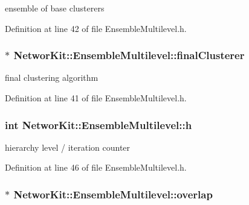 ensemble of base clusterers 



Definition at line 42 of file Ensemble\-Multilevel.\-h.

\hypertarget{class_networ_kit_1_1_ensemble_multilevel_a7a6938877c0d0f405b953eda8053c181}{
\subsubsection[{final\-Clusterer}]{$\ast$ Networ\-Kit\-::\-Ensemble\-Multilevel\-::final\-Clusterer\hspace{0.3cm}{\ttfamily [protected]}}}\label{class_networ_kit_1_1_ensemble_multilevel_a7a6938877c0d0f405b953eda8053c181}


final clustering algorithm 



Definition at line 41 of file Ensemble\-Multilevel.\-h.

\hypertarget{class_networ_kit_1_1_ensemble_multilevel_a4bc6df355537771fcdc186b308232391}{
\subsubsection[{h}]{\setlength{\rightskip}{0pt plus 5cm}int Networ\-Kit\-::\-Ensemble\-Multilevel\-::h\hspace{0.3cm}{\ttfamily [protected]}}}\label{class_networ_kit_1_1_ensemble_multilevel_a4bc6df355537771fcdc186b308232391}


hierarchy level / iteration counter 



Definition at line 46 of file Ensemble\-Multilevel.\-h.

\hypertarget{class_networ_kit_1_1_ensemble_multilevel_a4b3abd511fb680656839a9fc9b02c5db}{
\subsubsection[{overlap}]{$\ast$ Networ\-Kit\-::\-Ensemble\-Multilevel\-::overlap\hspace{0.3cm}{\ttfamily [protected]}}}\label{class_networ_kit_1_1_ensemble_multilevel_a4b3abd511fb680656839a9fc9b02c5db}


